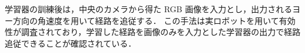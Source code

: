 学習器の訓練後は，中央のカメラから得た RGB 画像を入力とし，出力されるヨー方向の角速度を用いて経路を追従する．
この手法は実ロボットを用いて有効性が調査されており，学習した経路を画像のみを入力とした学習器の出力で経路追従できることが確認されている．
